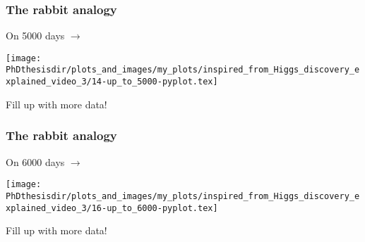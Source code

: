 \begin{frame}
\frametitle{The rabbit analogy}
\addtocounter{framenumber}{-1}
\transwipe[direction=90]
\begin{center}
\begin{minipage}[c]{.29\textwidth}
On \num{5000} days $\rightarrow$
\end{minipage}
\begin{minipage}[c]{.4\textwidth}
\vspace{-\baselineskip}
\texttt{[image: \\PhDthesisdir/plots\_and\_images/my\_plots/inspired\_from\_Higgs\_discovery\_explained\_video\_3/14-up\_to\_5000-pyplot.tex]}
\end{minipage}
\begin{minipage}[c]{.29\textwidth}
Fill up with more data!
\end{minipage}
\end{center}
\end{frame}


\begin{frame}
\frametitle{The rabbit analogy}
\addtocounter{framenumber}{-1}
\transwipe[direction=90]
\begin{center}
\begin{minipage}[c]{.29\textwidth}
On \num{6000} days $\rightarrow$
\end{minipage}
\begin{minipage}[c]{.4\textwidth}
\vspace{-\baselineskip}
\texttt{[image: \\PhDthesisdir/plots\_and\_images/my\_plots/inspired\_from\_Higgs\_discovery\_explained\_video\_3/16-up\_to\_6000-pyplot.tex]}
\end{minipage}
\begin{minipage}[c]{.29\textwidth}
Fill up with more data!
\end{minipage}
\end{center}
\end{frame}

